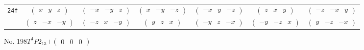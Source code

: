 \documentclass[fleqn,9pt,landscape]{jsarticle}
\begin{document}
\begin{center}
\begin{longtable}{ccccccc}
{\tt 24f} & $ \begin{pmatrix} x & y & z \end{pmatrix} $ & $ \begin{pmatrix} - x & - y & z \end{pmatrix} $ & $ \begin{pmatrix} x & - y & - z \end{pmatrix} $ & $ \begin{pmatrix} - x & y & - z \end{pmatrix} $ & $ \begin{pmatrix} z & x & y \end{pmatrix} $ & $ \begin{pmatrix} - z & - x & y \end{pmatrix} $ \\
& $ \begin{pmatrix} z & - x & - y \end{pmatrix} $ & $ \begin{pmatrix} - z & x & - y \end{pmatrix} $ & $ \begin{pmatrix} y & z & x \end{pmatrix} $ & $ \begin{pmatrix} - y & z & - x \end{pmatrix} $ & $ \begin{pmatrix} - y & - z & x \end{pmatrix} $ & $ \begin{pmatrix} y & - z & - x \end{pmatrix} $ \\
\end{longtable}
\end{center}
\newpage
No. 198\quad$T_{}^{4}$\quad$P2_13$\quad[ cubic ]\quad$+\begin{pmatrix} 0 & 0 & 0 \end{pmatrix}$
\end{document}

